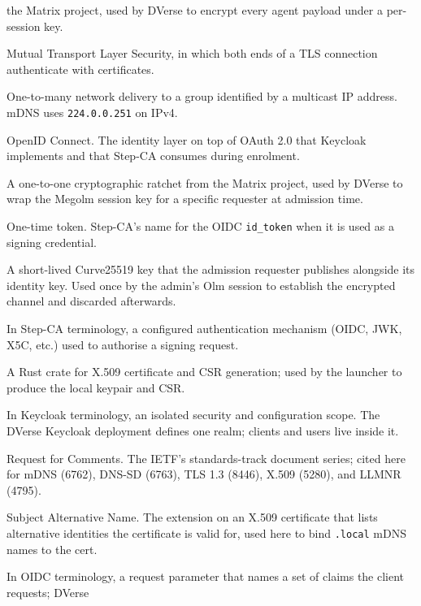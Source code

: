 \documentclass[11pt,a4paper]{article}
\begin{document}
\begin{description}[leftmargin=2.6cm, style=nextline, font=\sffamily\bfseries]
        the Matrix project, used by DVerse to encrypt every
        agent payload under a per-session key.
  \item[mTLS] Mutual Transport Layer Security, in which both
        ends of a TLS connection authenticate with
        certificates.
  \item[multicast] One-to-many network delivery to a group
        identified by a multicast IP address. mDNS uses
        \texttt{224.0.0.251} on IPv4.
  \item[OIDC] OpenID Connect. The identity layer on top of
        OAuth 2.0 that Keycloak implements and that Step-CA
        consumes during enrolment.
  \item[Olm] A one-to-one cryptographic ratchet from the
        Matrix project, used by DVerse to wrap the Megolm
        session key for a specific requester at admission
        time.
  \item[\texttt{ott}] One-time token. Step-CA's name for the
        OIDC \texttt{id\_token} when it is used as a signing
        credential.
  \item[prekey] A short-lived Curve25519 key that the
        admission requester publishes alongside its identity
        key. Used once by the admin's Olm session to
        establish the encrypted channel and discarded
        afterwards.
  \item[provisioner] In Step-CA terminology, a configured
        authentication mechanism (OIDC, JWK, X5C, etc.) used
        to authorise a signing request.
  \item[\texttt{rcgen}] A Rust crate for X.509 certificate
        and CSR generation; used by the launcher to produce
        the local keypair and CSR.
  \item[realm] In Keycloak terminology, an isolated security
        and configuration scope. The DVerse Keycloak deployment
        defines one realm; clients and users live inside it.
  \item[RFC] Request for Comments. The IETF's standards-track
        document series; cited here for mDNS (6762), DNS-SD
        (6763), TLS 1.3 (8446), X.509 (5280), and LLMNR
        (4795).
  \item[SAN] Subject Alternative Name. The extension on an
        X.509 certificate that lists alternative identities
        the certificate is valid for, used here to bind
        \texttt{.local} mDNS names to the cert.
  \item[scope] In OIDC terminology, a request parameter that
        names a set of claims the client requests; DVerse

\end{description}
\end{document}
